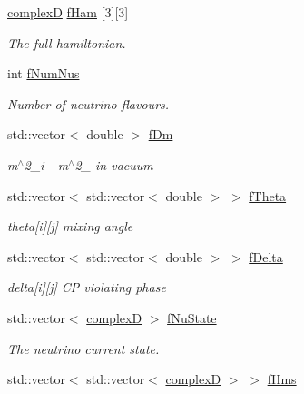 \begin{DoxyCompactItemize}
\item 
\hyperlink{EigenPoint_8h_a67ca8e107e20610c3fff78d5e726ece0}{complexD} \hyperlink{classOscProb_1_1PMNS__Fast_a94286a881bc53dd512a89d548346b611}{f\+Ham} \mbox{[}3\mbox{]}\mbox{[}3\mbox{]}
\begin{DoxyCompactList}\small\item\em The full hamiltonian. \end{DoxyCompactList}\item 
int \hyperlink{classOscProb_1_1PMNS__Base_a24bb74bed63569dfe88b18fa6a08060e}{f\+Num\+Nus}
\begin{DoxyCompactList}\small\item\em Number of neutrino flavours. \end{DoxyCompactList}\item 
std\+::vector$<$ double $>$ \hyperlink{classOscProb_1_1PMNS__Base_a406a31c3b5d620e5a0cace5b411f9f70}{f\+Dm}
\begin{DoxyCompactList}\small\item\em m$^\wedge$2\+\_\+i -\/ m$^\wedge$2\+\_ in vacuum \end{DoxyCompactList}\item 
std\+::vector$<$ std\+::vector$<$ double $>$ $>$ \hyperlink{classOscProb_1_1PMNS__Base_a1976887cd658dd86b2336c181f1470b4}{f\+Theta}
\begin{DoxyCompactList}\small\item\em theta\mbox{[}i\mbox{]}\mbox{[}j\mbox{]} mixing angle \end{DoxyCompactList}\item 
std\+::vector$<$ std\+::vector$<$ double $>$ $>$ \hyperlink{classOscProb_1_1PMNS__Base_ab2a5fa40e689b221c8a7d2c17213810d}{f\+Delta}
\begin{DoxyCompactList}\small\item\em delta\mbox{[}i\mbox{]}\mbox{[}j\mbox{]} CP violating phase \end{DoxyCompactList}\item 
std\+::vector$<$ \hyperlink{EigenPoint_8h_a67ca8e107e20610c3fff78d5e726ece0}{complexD} $>$ \hyperlink{classOscProb_1_1PMNS__Base_abf99f2339e3ee989600740b5d88063e8}{f\+Nu\+State}
\begin{DoxyCompactList}\small\item\em The neutrino current state. \end{DoxyCompactList}\item 
std\+::vector$<$ std\+::vector$<$ \hyperlink{EigenPoint_8h_a67ca8e107e20610c3fff78d5e726ece0}{complexD} $>$ $>$ \hyperlink{classOscProb_1_1PMNS__Base_acd3c8783e7603081eab316ea4c86c766}{f\+Hms}

\end{DoxyCompactItemize}
